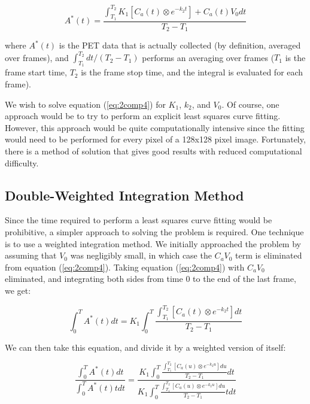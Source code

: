 \begin{equation}
A^{*}(t) = \frac{\int_{T_1}^{T_2} K_{1} \left[ C_{a}(t) \otimes
e^{-k_{2}t} \right] + C_{a}(t)V_{0} dt}{T_{2} - T_{1}}
\label{eq:2comp4}
\end{equation}

where $A^{*}(t)$ is the PET data that is actually collected (by
definition, averaged over frames), and ${\int_{T_1}^{T_2}dt} / {(T_2 -
T_1)}$ performs an averaging over frames ($T_1$ is the frame start
time, $T_2$ is the frame stop time, and the integral is evaluated for
each frame).

We wish to solve equation (\ref{eq:2comp4}) for $K_{1}$, $k_{2}$, and
$V_{0}$.  Of course, one approach would be to try to perform an
explicit least squares curve fitting.  However, this approach would be
quite computationally intensive since the fitting would need to be
performed for every pixel of a 128x128 pixel image.  Fortunately,
there is a method of solution that gives good results with reduced
computational difficulty.

\subsection{Double-Weighted Integration Method}

\label{sec:double_weight}

Since the time required to perform a least squares curve fitting would
be prohibitive, a simpler approach to solving the problem is required.
One technique is to use a weighted integration method.  We initially
approached the problem by assuming that $V_{0}$ was negligibly small,
in which case the $C_{a}V_{0}$ term is eliminated from equation
(\ref{eq:2comp4}).  Taking equation (\ref{eq:2comp4}) with $C_{a}V_0$
eliminated, and integrating both sides from time 0 to the end of the
last frame, we get:

\begin{equation}
\int_{0}^{T} A^{*}(t) dt = K_{1} \int_{0}^{T} \frac{\int_{T_1}^{T_2}
\left[ C_{a}(t) \otimes e^{-k_{2}t} \right] dt}{T_2 - T_1}
\end{equation}

We can then take this equation, and divide it by a weighted version
of itself:

\begin{equation}
\frac{\int_{0}^{T} A^{*}(t) dt}{\int_{0}^{T} A^{*}(t) t dt} =
\frac{K_{1} \int_{0}^{T} \frac{\int_{T_1}^{T_2} \left[ C_{a}(u)
\otimes e^{-k_{2}u} \right] du}{T_2 - T_1} dt}{K_{1} \int_{0}^{T}
\frac{\int_{T_1}^{T_2} \left[ C_{a}(u) \otimes e^{-k_{2}u} \right]
du}{T_2 - T_1} t dt}
\label{eq:1comp}
\end{equation}

